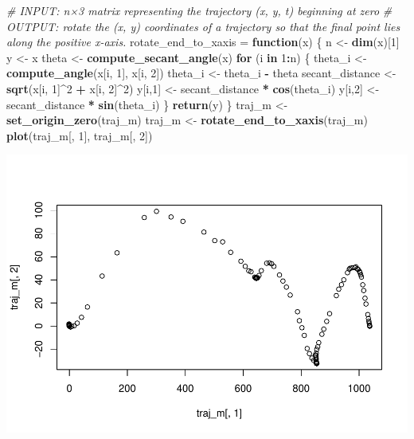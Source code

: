 \documentclass[]{article}
\newenvironment{Shaded}{\begin{snugshade}}{\end{snugshade}}
\newcommand{\CommentTok}[1]{\textcolor[rgb]{0.56,0.35,0.01}{\textit{#1}}}
\newcommand{\ControlFlowTok}[1]{\textcolor[rgb]{0.13,0.29,0.53}{\textbf{#1}}}
\newcommand{\DecValTok}[1]{\textcolor[rgb]{0.00,0.00,0.81}{#1}}
\newcommand{\KeywordTok}[1]{\textcolor[rgb]{0.13,0.29,0.53}{\textbf{#1}}}
\newcommand{\NormalTok}[1]{#1}
\newcommand{\OperatorTok}[1]{\textcolor[rgb]{0.81,0.36,0.00}{\textbf{#1}}}
\newcommand{\StringTok}[1]{\textcolor[rgb]{0.31,0.60,0.02}{#1}}
\begin{document}
\begin{Shaded}
\begin{Highlighting}[]
\CommentTok{# INPUT: n×3 matrix representing the trajectory (x, y, t) beginning at zero}
\CommentTok{# OUTPUT: rotate the (x, y) coordinates of a trajectory so that the final point lies along the positive x-axis.}
\NormalTok{rotate_end_to_xaxis =}\StringTok{ }\ControlFlowTok{function}\NormalTok{(x) \{}
\NormalTok{  n <-}\StringTok{ }\KeywordTok{dim}\NormalTok{(x)[}\DecValTok{1}\NormalTok{]}
\NormalTok{  y <-}\StringTok{ }\NormalTok{x}
\NormalTok{  theta <-}\StringTok{ }\KeywordTok{compute_secant_angle}\NormalTok{(x)}
  \ControlFlowTok{for}\NormalTok{ (i }\ControlFlowTok{in} \DecValTok{1}\OperatorTok{:}\NormalTok{n) \{}
\NormalTok{    theta_i <-}\StringTok{ }\KeywordTok{compute_angle}\NormalTok{(x[i, }\DecValTok{1}\NormalTok{], x[i, }\DecValTok{2}\NormalTok{])}
\NormalTok{    theta_i <-}\StringTok{ }\NormalTok{theta_i }\OperatorTok{-}\StringTok{ }\NormalTok{theta}
\NormalTok{    secant_distance <-}\StringTok{ }\KeywordTok{sqrt}\NormalTok{(x[i, }\DecValTok{1}\NormalTok{]}\OperatorTok{^}\DecValTok{2} \OperatorTok{+}\StringTok{ }\NormalTok{x[i, }\DecValTok{2}\NormalTok{]}\OperatorTok{^}\DecValTok{2}\NormalTok{)}
\NormalTok{    y[i,}\DecValTok{1}\NormalTok{] <-}\StringTok{ }\NormalTok{secant_distance }\OperatorTok{*}\StringTok{ }\KeywordTok{cos}\NormalTok{(theta_i)}
\NormalTok{    y[i,}\DecValTok{2}\NormalTok{] <-}\StringTok{ }\NormalTok{secant_distance }\OperatorTok{*}\StringTok{ }\KeywordTok{sin}\NormalTok{(theta_i)}
\NormalTok{  \}}
  \KeywordTok{return}\NormalTok{(y)}
\NormalTok{\}}
\NormalTok{traj_m <-}\StringTok{ }\KeywordTok{set_origin_zero}\NormalTok{(traj_m)}
\NormalTok{traj_m <-}\StringTok{ }\KeywordTok{rotate_end_to_xaxis}\NormalTok{(traj_m)}
\KeywordTok{plot}\NormalTok{(traj_m[, }\DecValTok{1}\NormalTok{], traj_m[, }\DecValTok{2}\NormalTok{])}
\end{Highlighting}
\end{Shaded}

\includegraphics{ps1_q3_files/figure-latex/unnamed-chunk-4-1.pdf}
\end{document}
